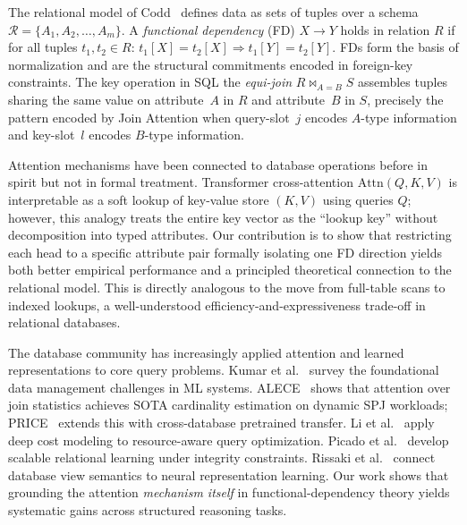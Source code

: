 \documentclass[conference]{IEEEtran}
\begin{document}

The relational model of Codd~\cite{codd1970relational} defines data as sets of tuples over a schema $\mathcal{R} = \{A_1, A_2, \ldots, A_m\}$. A \emph{functional dependency} (FD) $X \to Y$ holds in relation $R$ if for all tuples $t_1, t_2 \in R$: $t_1[X] = t_2[X] \Rightarrow t_1[Y] = t_2[Y]$. FDs form the basis of normalization and are the structural commitments encoded in foreign-key constraints. The key operation in SQL the \emph{equi-join} $R \bowtie_{A=B} S$ assembles tuples sharing the same value on attribute~$A$ in $R$ and attribute~$B$ in $S$, precisely the pattern encoded by Join Attention when query-slot~$j$ encodes $A$-type information and key-slot~$l$ encodes $B$-type information.

Attention mechanisms have been connected to database operations before in spirit but not in formal treatment. Transformer cross-attention $\mathrm{Attn}(Q, K, V)$ is interpretable as a soft lookup of key-value store $(K, V)$ using queries $Q$; however, this analogy treats the entire key vector as the ``lookup key'' without decomposition into typed attributes. Our contribution is to show that restricting each head to a specific attribute pair formally isolating one FD direction yields both better empirical performance and a principled theoretical connection to the relational model. This is directly analogous to the move from full-table scans to indexed lookups, a well-understood efficiency-and-expressiveness trade-off in relational databases.

The database community has increasingly applied attention and learned representations to core query problems. Kumar et al.~\cite{kumar2017sigmod} survey the foundational data management challenges in ML systems. ALECE~\cite{li2023alece} shows that attention over join statistics achieves SOTA cardinality estimation on dynamic SPJ workloads; PRICE~\cite{zeng2024price} extends this with cross-database pretrained transfer. Li et al.~\cite{li2022icde} apply deep cost modeling to resource-aware query optimization. Picado et al.~\cite{picado2021sigmod} develop scalable relational learning under integrity constraints. Rissaki et al.~\cite{rissaki2026vldb} connect database view semantics to neural representation learning. Our work shows that grounding the attention \emph{mechanism itself} in functional-dependency theory yields systematic gains across structured reasoning tasks.
\end{document}
